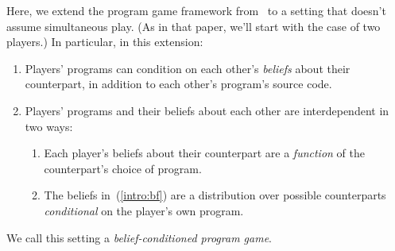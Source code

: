 \documentclass[sigconf]{aamas}
\theoremstyle{definition}
\begin{document}

Here, we extend the program game framework from~\citet{digiovanni2024safe} to a setting that doesn't assume simultaneous play. (As in that paper, we'll start with the case of two players.) In particular, in this extension:
\begin{enumerate}
    \item Players' programs can condition on each other's \emph{beliefs} about their counterpart, in addition to each other's program's source code. \label{intro:belcond}
    \item  Players' programs and their beliefs about each other are interdependent in two ways:
    \begin{enumerate}
        \item Each player's beliefs about their counterpart are a \textit{function} of the counterpart's choice of program.
        \label{intro:bf}
        \item The beliefs in~(\ref{intro:bf}) are 
        a distribution over possible counterparts \textit{conditional} on the player's own program. 
        \label{intro:scb}
    \end{enumerate}
\end{enumerate}
We call this setting a \emph{belief-conditioned program game}.
\end{document}
